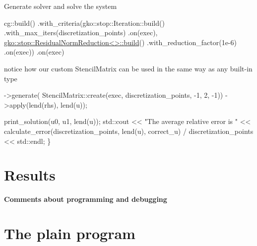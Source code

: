 Generate solver and solve the system


\begin{DoxyCode}
cg::build()
    .with\_criteria(gko::stop::Iteration::build()
                       .with\_max\_iters(discretization\_points)
                       .on(exec),
                   \hyperlink{classgko_1_1stop_1_1ResidualNormReduction}{gko::stop::ResidualNormReduction<>::build}()
                       .with\_reduction\_factor(1e-6)
                       .on(exec))
    .on(exec)
\end{DoxyCode}


notice how our custom Stencil\+Matrix can be used in the same way as any built-\/in type


\begin{DoxyCode}
        ->generate(
            StencilMatrix::create(exec, discretization\_points, -1, 2, -1))
        ->apply(lend(rhs), lend(u));

    print\_solution(u0, u1, lend(u));
    std::cout << \textcolor{stringliteral}{"The average relative error is "}
              << calculate\_error(discretization\_points, lend(u), correct\_u) /
                     discretization\_points
              << std::endl;
\}
\end{DoxyCode}
 \label{_Results}%
\section*{Results}

\label{_Commentsaboutprogramminganddebugging}%
\paragraph*{Comments about programming and debugging }

\label{_PlainProg}%
 \section*{The plain program}


